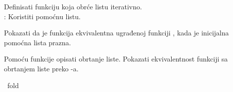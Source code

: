 \begin{isabellebody}
\begin{exercise}[subtitle=Algebarski tip podataka: lista.]
\begin{isamarkuptext}%
Definisati funkciju  koja obrće listu iterativno.\\
      : Koristiti pomoćnu listu.%
\end{isamarkuptext}\isamarkuptrue%
%
\begin{isamarkuptext}%
Pokazati da je funkcija  ekvivalentna ugrađenoj
      funkciji , kada je inicijalna pomoćna lista prazna.%
\end{isamarkuptext}\isamarkuptrue%
%
\begin{isamarkuptext}%
Pomoću funkcije  opisati obrtanje liste.
      Pokazati ekvivalentnost funkciji  sa obrtanjem liste preko -a.%
\end{isamarkuptext}\isamarkuptrue%
\isamarkupfalse%
\ fold%
\end{exercise}
%
\isadelimtheory
%
\endisadelimtheory
%
\isatagtheory
%
\endisatagtheory
{\isafoldtheory}%
%
\isadelimtheory
%
\endisadelimtheory
%
\end{isabellebody}%
\endinput
